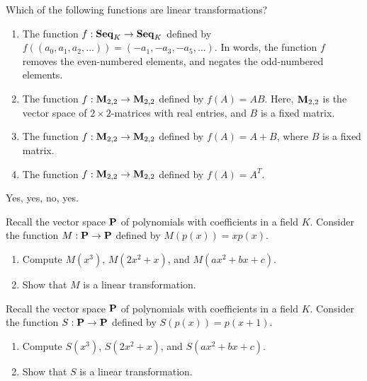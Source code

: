 \begin{ex}
  Which of the following functions are linear transformations?
  \begin{enumerate}
  \item The function $f:\mathbf{Seq}_K\to\mathbf{Seq}_K$ defined by
    $f((a_0,a_1,a_2,\ldots)) = (-a_1,-a_3,-a_5,\ldots)$. In words, the
    function $f$ removes the even-numbered elements, and negates the
    odd-numbered elements.
  \item The function $f:\mathbf{M}_{2,2}\to\mathbf{M}_{2,2}$ defined by $f(A) =
    AB$. Here, $\mathbf{M}_{2,2}$ is the vector space of $2\times
    2$-matrices with real entries, and $B$ is a fixed matrix.
  \item The function $f:\mathbf{M}_{2,2}\to\mathbf{M}_{2,2}$ defined by $f(A) =
    A+B$, where $B$ is a fixed matrix.
  \item The function $f:\mathbf{M}_{2,2}\to\mathbf{M}_{2,2}$ defined by $f(A) =
    A^T$.
  \end{enumerate}
  \begin{sol}
    Yes, yes, no, yes.
  \end{sol}
\end{ex}

\begin{ex}
  Recall the vector space $\mathbf{P}$ of polynomials with coefficients in
  a field $K$. Consider the function $M:\mathbf{P}\to\mathbf{P}$ defined by
  $M(p(x)) = xp(x)$.
  \begin{enumerate}
  \item Compute $M(x^3)$, $M(2x^2+x)$, and $M(ax^2+bx+c)$.
  \item Show that $M$ is a linear transformation.
  \end{enumerate}
\end{ex}

\begin{ex}
  Recall the vector space $\mathbf{P}$ of polynomials with coefficients in
  a field $K$. Consider the function $S:\mathbf{P}\to\mathbf{P}$ defined by
  $S(p(x)) = p(x+1)$.
  \begin{enumerate}
  \item Compute $S(x^3)$, $S(2x^2+x)$, and $S(ax^2+bx+c)$.
  \item Show that $S$ is a linear transformation.
  \end{enumerate}
\end{ex}

